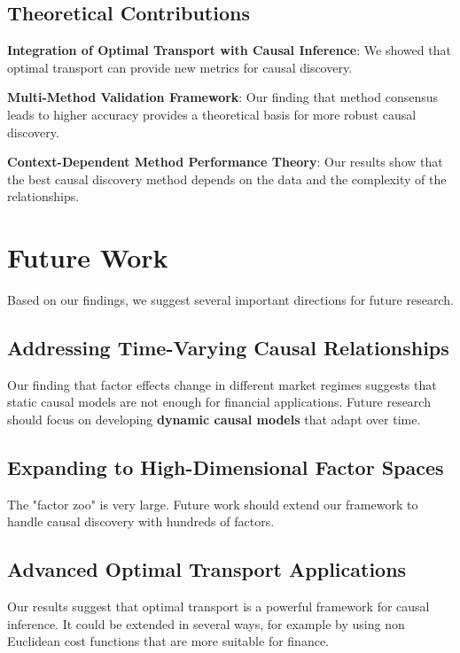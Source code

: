 \subsection{Theoretical Contributions}

\textbf{Integration of Optimal Transport with Causal Inference}: We showed that optimal transport can provide new metrics for causal discovery.

\textbf{Multi-Method Validation Framework}: Our finding that method consensus leads to higher accuracy provides a theoretical basis for more robust causal discovery.

\textbf{Context-Dependent Method Performance Theory}: Our results show that the best causal discovery method depends on the data and the complexity of the relationships.

\section{Future Work}

Based on our findings, we suggest several important directions for future research.

\subsection{Addressing Time-Varying Causal Relationships}

Our finding that factor effects change in different market regimes suggests that static causal models are not enough for financial applications. Future research should focus on developing \textbf{dynamic causal models} that adapt over time.

\subsection{Expanding to High-Dimensional Factor Spaces}

The "factor zoo" is very large. Future work should extend our framework to handle causal discovery with hundreds of factors.

\subsection{Advanced Optimal Transport Applications}

Our results suggest that optimal transport is a powerful framework for causal inference. It could be extended in several ways, for example by using non Euclidean cost functions that are more suitable for finance.

